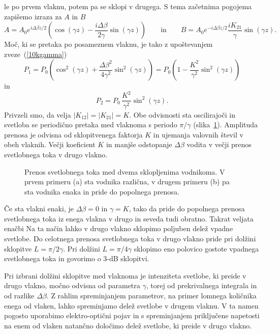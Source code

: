 le po prvem vlaknu, potem pa se sklopi v drugega. S tema začetnima pogojema zapišemo izraza 
za $A$ in $B$
\begin{equation}
 A = A_0 e^{i \Delta \beta z/2} \left( \cos(\gamma z) - 
\frac{i \Delta \beta}{2 \gamma}\sin(\gamma z) \right)
\qquad \mathrm{in} \qquad 
B =  A_0 e^{-i \Delta \beta z/2} \frac{i K_{21}}{\gamma}\sin(\gamma z).
\end{equation}
Moč, ki se pretaka po posameznem vlaknu, je tako z upoštevanjem zveze~(\ref{10kgamma})
\begin{equation}
P_1 = P_0 \left( \cos^2(\gamma z) + \frac{\Delta \beta^2}{4 \gamma^2}\sin^2(\gamma z) \right)
= P_0 \left( 1 - \frac{K^2}{\gamma^2}\sin^2(\gamma z) \right)
\end{equation}
in
\begin{equation}
P_2 =  P_0\, \frac{K^2}{\gamma^2}\sin^2(\gamma z).
\end{equation}
Privzeli smo, da velja $|K_{12}|=|K_{21}|= K$. 
Obe odvisnosti sta oscilirajoči in svetloba se periodično pretaka med vlaknoma
s periodo $\pi/\gamma$ (slika~\ref{fig:foscil}). Amplituda prenosa je 
odvisna od sklopitvenega faktorja $K$ in ujemanja valovnih 
števil v obeh vlaknih. Večji koeficient $K$
in manjše odstopanje $\Delta \beta$ vodita v večji prenos svetlobnega toka v drugo vlakno. 
\begin{figure}[h!]
\centering
\def\svgwidth{140truemm} 
 
\caption{Prenos svetlobnega toka med dvema sklopljenima vodnikoma. V prvem primeru (a) sta
vodnika različna, v drugem primeru (b) pa sta vodnika enaka in pride do popolnega prenosa.}
\label{fig:foscil}
\end{figure}

Če sta vlakni 
enaki, je $\Delta \beta = 0$ in $\gamma = K$, tako da pride do popolnega prenosa
svetlobnega toka iz enega vlakna v drugo in seveda tudi obratno.
Takrat veljata enačbi
Na ta način lahko v drugo vlakno sklopimo poljuben delež vpadne svetlobe. 
Do celotnega prenosa svetlobnega toka v drugo vlakno pride pri dolžini sklopitve $L = \pi/2 \gamma$. 
Pri dolžini $L = \pi/4 \gamma$ sklopimo eno polovico gostote vpadnega svetlobnega toka in govorimo o 3-dB sklopitvi. 

\begin{remark}
 Pri izbrani dolžini sklopitve med vlaknoma je intenziteta svetlobe, ki preide v drugo vlakno,
 močno odvisna od parametra $\gamma$, torej od prekrivalnega integrala in od razlike $\Delta \beta$. 
 Z rahlim spreminjanjem parametrov, na primer lomnega 
 količnika enega od vlaken, lahko spreminjamo delež svetlobe v drugem vlaknu. V ta 
 namen pogosto uporabimo elektro-optični pojav in s spreminjanjem priključene napetosti na
 enem od vlaken natančno določimo delež svetlobe, ki preide v drugo vlakno. 
\end{remark}

